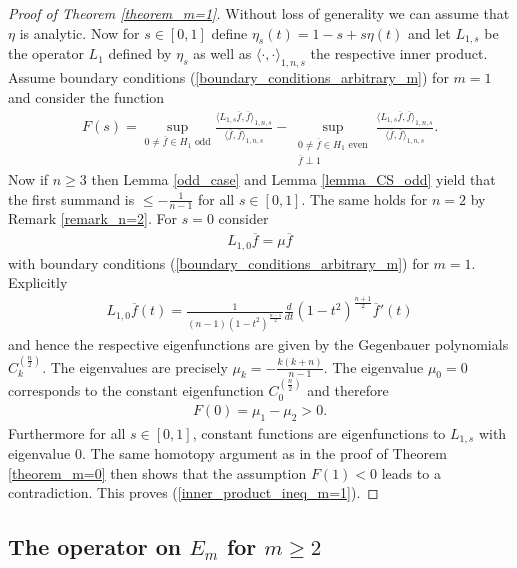 \documentclass[12pt,twoside]{amsart}
\numberwithin{satz}{section}
\theoremstyle{definition}
\numberwithin{equation}{section}
\begin{document}
	\begin{proof}[Proof of Theorem \ref{theorem_m=1}]
		Without loss of generality we can assume that $\eta$ is analytic. Now for $s\in [0,1]$ define $\eta_s(t)=1-s+s\eta(t)$ and let $L_{1,s}$ be the operator $L_1$ defined by $\eta_s$ as well as $\langle\cdot,\cdot\rangle_{1,n,s}$ the respective inner product. Assume boundary conditions (\ref{boundary_conditions_arbitrary_m}) for $m=1$ and consider the function
		\begin{align}\label{definition_F(s)_m=1}
			F(s)= \sup_{0\neq\overline{f}\in H_1 \text{ odd}} \frac{\langle L_{1,s}\overline{f},\overline{f}\rangle_{1,n,s}}{\langle \overline{f},\overline{f}\rangle_{1,n,s}}-\sup_{\substack{0\neq\overline{f}\in H_1 \text{ even}\\ \overline{f}\perp 1}} \frac{\langle L_{1,s}\overline{f},\overline{f}\rangle_{1,n,s}}{\langle \overline{f},\overline{f}\rangle_{1,n,s}}.
		\end{align}
		Now if $n\geq 3$ then Lemma \ref{odd_case} and Lemma \ref{lemma_CS_odd} yield that the first summand is $\leq -\frac{1}{n-1}$ for all $s\in[0,1]$. The same holds for $n=2$ by Remark \ref{remark_n=2}. For $s=0$ consider
		\begin{align*}
			L_{1,0}\overline{f}=\mu\overline{f}
		\end{align*}
		with boundary conditions (\ref{boundary_conditions_arbitrary_m}) for $m=1$. Explicitly
		\begin{align*}
			L_{1,0}\overline{f}(t)=\frac{1}{(n-1)(1-t^2)^{\frac{n-1}{2}}}\frac{d}{dt}(1-t^2)^{\frac{n+1}{2}}\overline{f}'(t)
		\end{align*}
		and hence the respective eigenfunctions are given by the Gegenbauer polynomials $C_k^{\left(\frac{n}{2}\right)}$. The eigenvalues are precisely $\mu_k=-\frac{k(k+n)}{n-1}$. The eigenvalue $\mu_0=0$ corresponds to the constant eigenfunction $C_0^{\left(\frac{n}{2}\right)}$ and therefore
		\begin{align*}
			F(0)=\mu_1 - \mu_2 > 0.
		\end{align*}
		Furthermore for all $s\in[0,1]$, constant functions are eigenfunctions to $L_{1,s}$ with eigenvalue $0$. The same homotopy argument as in the proof of Theorem \ref{theorem_m=0} then shows that the assumption $F(1)<0$ leads to a contradiction. This proves (\ref{inner_product_ineq_m=1}). 
	\end{proof}

	\subsection{The operator on $E_m$ for $m\geq 2$}\label{section_m>1}
	
\end{document}
